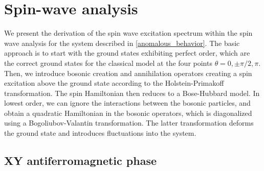 \chapter{Spin-wave analysis}
\label{spinwave_analysis}

We present the derivation of the spin wave excitation spectrum
within the spin wave analysis for the system described in \cref{anomalous_behavior}.
The basic approach is to start with the ground
states exhibiting perfect order, which are the correct ground states for the classical
model at the four points $\theta = 0,\pm \pi/2, \pi$.  Then, we introduce bosonic
creation and annihilation operators creating a spin excitation above the ground
state according to the Holstein-Primakoff transformation. The spin Hamiltonian
then reduces to a Bose-Hubbard model. In lowest order, we can ignore the
interactions between the bosonic particles, and obtain a quadratic Hamiltonian
in the bosonic operators, which is diagonalized using a
Bogoliubov-Valantin transformation.  The latter transformation deforms the
ground state and introduces fluctuations into the system.

\section{XY antiferromagnetic phase}

